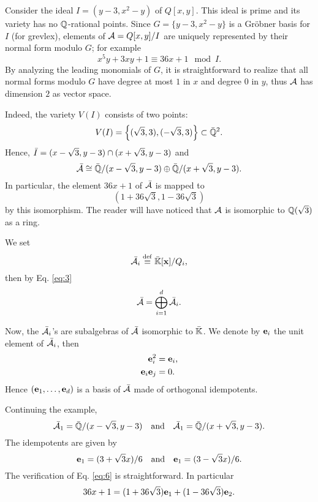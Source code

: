 \begin{example}
  Consider the ideal $I=(y-3,x^2-y)$ of $Q[x,y]$. This ideal is prime
  and its variety has no $\mathbb{Q}$-rational points. Since $G=\{y-3,x^2-y\}$
  is a Gröbner basis for $I$ (for grevlex), elements of
  $\mathcal{A}=Q[x,y]/I$ are uniquely represented by their normal form
  modulo $G$; for example
  \[x^5y + 3xy + 1 \equiv 36x + 1 \mod I\text{.}\] By analyzing the
  leading monomials of $G$, it is straightforward to realize that all
  normal forms modulo $G$ have degree at most $1$ in $x$ and degree
  $0$ in $y$, thus $\mathcal{A}$ has dimension $2$ as vector space.

  Indeed, the variety $V(I)$ consists of two points:
  \[V(I)=\left\{(\sqrt{3},3), (-\sqrt{3},3)\right\}\subset\bar{\mathbb{Q}}^2\text{.}\]
  Hence, $\bar{I}=(x-\sqrt{3},y-3)\cap(x+\sqrt{3},y-3)$ and
  \[\bar{\mathcal{A}}\cong \bar{\mathbb{Q}}/(x-\sqrt{3},y-3) \oplus
  \bar{\mathbb{Q}}/(x+\sqrt{3},y-3)\text{.}\] In particular, the element
  $36x+1$ of $\bar{\mathcal{A}}$ is mapped to
  \[(1+36\sqrt{3},1-36\sqrt{3})\] by this isomorphism. The reader will
  have noticed that $\mathcal{A}$ is isomorphic to $\mathbb{Q}(\sqrt{3})$ as a ring.
\end{example}

We set 
\begin{equation}
  \label{eq:4}
  \bar{\mathcal{A}}_i\overset{\mathrm{def}}{\equiv} \bar{\mathbb{K}}[\mathbf{x}]/Q_i
  \text{,}
\end{equation}
then by Eq. \eqref{eq:3} 
\begin{equation}
  \label{eq:5}
  \bar{\mathcal{A}} = \bigoplus_{i=1}^d\bar{\mathcal{A}_i}
  \text{.}
\end{equation}

Now, the $\bar{\mathcal{A}}_i$'s are subalgebras of $\bar{\mathcal{A}}$
isomorphic to $\bar{\mathbb{K}}$. We denote by $\mathbf{e}_i$ the unit element
of $\bar{\mathcal{A}}_i$, then
\begin{equation}
  \label{eq:6}
  \begin{aligned}
    \mathbf{e}_i^2 &= \mathbf{e}_i\text{,}\\
    \mathbf{e}_i\mathbf{e}_j &= 0\text{.}
  \end{aligned}
\end{equation}
Hence $(\mathbf{e}_1,\ldots,\mathbf{e}_d)$ is a basis of
$\bar{\mathcal{A}}$ made of orthogonal idempotents.

\begin{example}
  Continuing the example, 
  \[\bar{\mathcal{A}}_1 = \bar{\mathbb{Q}}/(x-\sqrt{3},y-3)
  \quad\text{and}\quad
  \bar{\mathcal{A}}_1 = \bar{\mathbb{Q}}/(x+\sqrt{3},y-3)
  \text{.}\]
  The idempotents are given by
  \[\mathbf{e}_1 = (3+\sqrt{3}x)/6
  \quad\text{and}\quad \mathbf{e}_1 = (3-\sqrt{3}x)/6 \text{.}\] The
  verification of Eq. \eqref{eq:6} is straightforward. In particular
  \[36x + 1 = (1+36\sqrt{3})\mathbf{e}_1 + (1-36\sqrt{3})\mathbf{e}_2
  \text{.}\]
\end{example}


